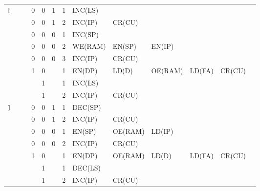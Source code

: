 \begin{longtable}[c] {c|ccccc|c|llllll}
    \rowcolor{Gray}  \texttt{[}   &   &   & 0 & 0     & 1    & 1     & INC(LS)  &          &         &        &        &        \\
    \rowcolor{Gray}               &   &   & 0 & 0     & 1    & 2     & INC(IP)  & CR(CU)   &         &        &        &        \\      
    \rowcolor{White}              &   &   & 0 & 0     & 0    & 1     & INC(SP)  &          &         &        &        &        \\
    \rowcolor{White}              &   &   & 0 & 0     & 0    & 2     & WE(RAM)  & EN(SP)   & EN(IP)  &        &        &        \\
    \rowcolor{White}              &   &   & 0 & 0     & 0    & 3     & INC(IP)  & CR(CU)   &         &        &        &        \\
    \rowcolor{Gray}               &   &   & 1 & 0     &      & 1     & EN(DP)   & LD(D)    & OE(RAM) & LD(FA) & CR(CU) &        \\
    \rowcolor{White}              &   &   &   & 1     &      & 1     & INC(LS)  &          &         &        &        &        \\
    \rowcolor{White}              &   &   &   & 1     &      & 2     & INC(IP)  & CR(CU)   &         &        &        &        \\ \hline
    
    \rowcolor{Gray} \texttt{]}   &   &   & 0 & 0     & 1    & 1     & DEC(SP)  &          &         &        &        &        \\
    \rowcolor{Gray}              &   &   & 0 & 0     & 1    & 2     & INC(IP)  & CR(CU)   &         &        &        &        \\
        
    \rowcolor{White}               &   &   & 0 & 0     & 0    & 1     & EN(SP)   & OE(RAM)  & LD(IP)  &        &        &        \\
    \rowcolor{White}               &   &   & 0 & 0     & 0    & 2     & INC(IP)  & CR(CU)   &         &        &        &        \\
    \rowcolor{Gray}              &   &   & 1 & 0     &      & 1     & EN(DP)   & OE(RAM)  & LD(D)   & LD(FA) & CR(CU) &        \\
    \rowcolor{White}               &   &   &   & 1     &      & 1     & DEC(LS)  &          &         &        &        &        \\ 
    \rowcolor{White}               &   &   &   & 1     &      & 2     & INC(IP)  & CR(CU)   &         &        &        &        \\ \hline


\end{longtable}

